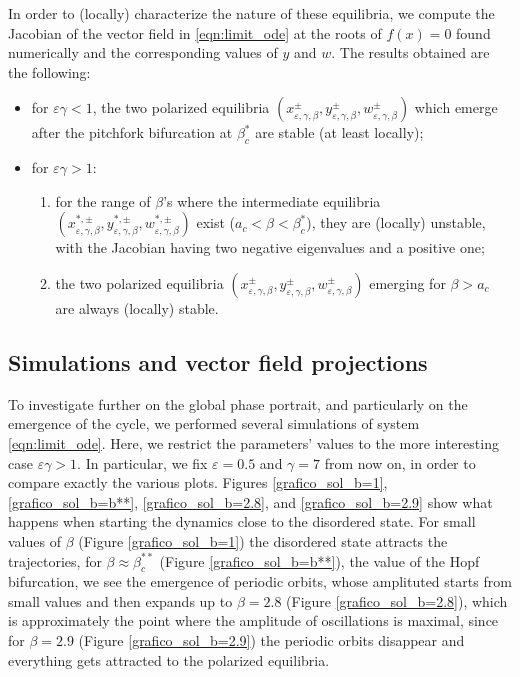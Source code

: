 \documentclass[a4paper,10pt,leqno]{amsart}
\theoremstyle{plain}
\begin{document}
In order to (locally) characterize the nature of these equilibria, we compute the Jacobian of the vector field in \eqref{eqn:limit_ode} at the roots of $f(x) = 0$ found numerically and the corresponding values of $y$ and $w$. 
The results obtained are the following:
\begin{itemize}
\item for $\varepsilon \gamma < 1$, the two polarized equilibria $(x^\pm_{\varepsilon, \gamma, \beta}, y^\pm_{\varepsilon,\gamma,\beta},w^\pm_{\varepsilon,\gamma,\beta})$ which emerge after the pitchfork bifurcation at $\beta^*_c$ are stable (at least locally);
\item for $\varepsilon \gamma > 1$: 
\begin{enumerate}
\item for the range of $\beta$'s where the intermediate equilibria  $(x^{*,\pm}_{\varepsilon, \gamma, \beta}, y^{*,\pm}_{\varepsilon,\gamma,\beta},w^{*,\pm}_{\varepsilon,\gamma,\beta})$ exist ($a_c < \beta < \beta^{*}_c$), they are (locally) unstable, with the Jacobian having two negative eigenvalues and a positive one;
\item the two polarized equilibria $(x^\pm_{\varepsilon, \gamma, \beta}, y^\pm_{\varepsilon,\gamma,\beta},w^\pm_{\varepsilon,\gamma,\beta})$ emerging for $ \beta > a_c$ are always (locally) stable.
\end{enumerate}
\end{itemize}

\subsection{Simulations and vector field projections}
To investigate further on the global phase portrait, and particularly on the emergence of the cycle, we performed several simulations of system \eqref{eqn:limit_ode}. Here, we restrict the parameters' values to the more interesting case $\varepsilon \gamma > 1$. In particular, we fix $\varepsilon = 0.5$ and $\gamma = 7$ from now on, in order to compare exactly the various plots.
Figures \ref{grafico_sol_b=1}, \ref{grafico_sol_b=b**}, \ref{grafico_sol_b=2.8}, and \ref{grafico_sol_b=2.9} show what happens when starting the dynamics close to the disordered state. For small values of $\beta$ (Figure  \ref{grafico_sol_b=1}) the disordered state attracts the trajectories, for $\beta \approx \beta^{**}_c$ (Figure \ref{grafico_sol_b=b**}), the value of the Hopf bifurcation, we see the emergence of periodic orbits, whose amplituted starts from small values and then expands up to $\beta = 2.8$ (Figure \ref{grafico_sol_b=2.8}), which is approximately the point where the amplitude of oscillations is maximal, since for $\beta = 2.9$ (Figure \ref{grafico_sol_b=2.9}) the periodic orbits disappear and everything gets attracted to the polarized equilibria.
\end{document}
